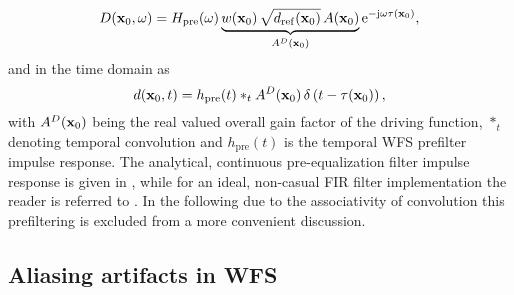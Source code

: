 \documentclass[conference]{IEEEtran}
\begin{document}
\begin{equation}
    D(\mathbf{x}_0,\omega) = H_{\text{pre}}(\omega)
    \underbrace{ w(\mathbf{x}_0)  \, \sqrt{d_{\mathrm{ref}}(\mathbf{x}_0)} \, A(\mathbf{x}_0) }_{A^D(\mathbf{x}_0)} \mathrm{e}^{- \mathrm{j} \omega \tau(\mathbf{x}_0)}
    ,
\end{equation}
and in the time domain as
\begin{equation}
    d(\vxo,t) = h_{\text{pre}}(t) \ast_t  A^D(\vxo)\,  \delta\left( t - \tau(\vxo)\right),
    \label{eq:d_wfs_td}
\end{equation}
with $A^D(\mathbf{x}_0)$ being the real valued overall gain factor of the driving function, $\ast_t$ denoting temporal convolution and $h_{\text{pre}}(t)$ is the temporal WFS prefilter impulse response.
The analytical, continuous pre-equalization filter impulse response is given in \cite{Deregowski1983, Firtha2019phd}, while for an ideal, non-casual FIR filter implementation the reader is referred to \cite{Schultz2016}.
In the following due to the associativity of convolution this prefiltering is excluded from a more convenient discussion.

\subsection{Aliasing artifacts in WFS}
\end{document}
